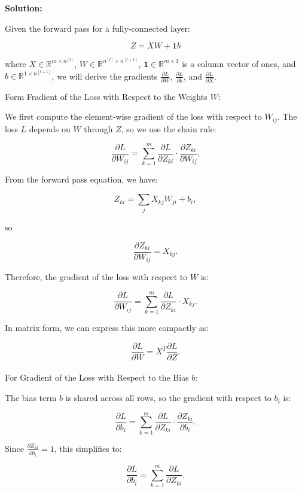 \documentclass{article}
\newenvironment{solution}{\color{blue} \smallskip \textbf{Solution:}}{}
\begin{document}
\begin{solution}
 
 
 Given the forward pass for a fully-connected layer:

\[
Z = XW + \mathbf{1}b
\]

where \(X \in \mathbb{R}^{m \times n^{[l]}}\), \(W \in \mathbb{R}^{n^{[l]} \times n^{[l+1]}}\), \(\mathbf{1} \in \mathbb{R}^{m \times 1}\) is a column vector of ones, and \(b \in \mathbb{R}^{1 \times n^{[l+1]}}\), we will derive the gradients \(\frac{\partial L}{\partial W}\), \(\frac{\partial L}{\partial b}\), and \(\frac{\partial L}{\partial X}\).\newline


Form Fradient of the Loss with Respect to the Weights \(W\):

We first compute the element-wise gradient of the loss with respect to \(W_{ij}\). The loss \(L\) depends on \(W\) through \(Z\), so we use the chain rule:

\[
\frac{\partial L}{\partial W_{ij}} = \sum_{k=1}^{m} \frac{\partial L}{\partial Z_{ki}} \cdot \frac{\partial Z_{ki}}{\partial W_{ij}}.
\]

From the forward pass equation, we have:

\[
Z_{ki} = \sum_{j} X_{kj} W_{ji} + b_i,
\]

so

\[
\frac{\partial Z_{ki}}{\partial W_{ij}} = X_{kj}.
\]

Therefore, the gradient of the loss with respect to \(W\) is:

\[
\frac{\partial L}{\partial W_{ij}} = \sum_{k=1}^{m} \frac{\partial L}{\partial Z_{ki}} \cdot X_{kj}.
\]

In matrix form, we can express this more compactly as:

\[
\frac{\partial L}{\partial W} = X^T \frac{\partial L}{\partial Z}.
\]\\

For Gradient of the Loss with Respect to the Bias \(b\):

The bias term \(b\) is shared across all rows, so the gradient with respect to \(b_i\) is:

\[
\frac{\partial L}{\partial b_i} = \sum_{k=1}^{m} \frac{\partial L}{\partial Z_{ki}} \cdot \frac{\partial Z_{ki}}{\partial b_i}.
\]

Since \(\frac{\partial Z_{ki}}{\partial b_i} = 1\), this simplifies to:

\[
\frac{\partial L}{\partial b_i} = \sum_{k=1}^{m} \frac{\partial L}{\partial Z_{ki}}.
\]


\end{solution}
\end{document}
